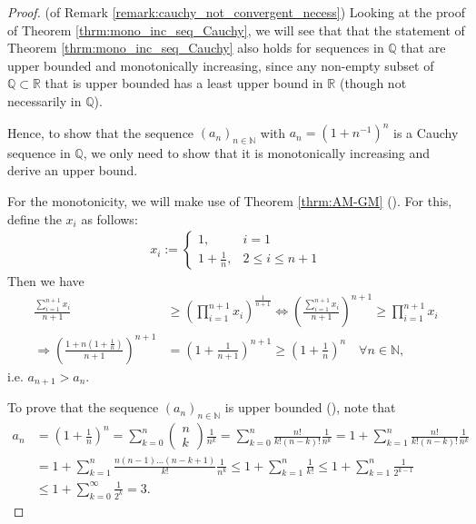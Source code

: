 \documentclass[12pt, a4paper]{article}
\numberwithin{equation}{section}
\theoremstyle{definition}
\theoremstyle{definition}
\begin{document}
	\begin{proof}(of Remark \ref{remark:cauchy_not_convergent_necess}) 
		Looking at the proof of Theorem \ref{thrm:mono_inc_seq_Cauchy}, we will see that that the statement of Theorem \ref{thrm:mono_inc_seq_Cauchy} also holds for sequences in $\mathbb Q$ that are upper bounded and monotonically increasing, since any non-empty subset of $\mathbb Q\subset \mathbb R$ that is upper bounded has a least upper bound in $\mathbb R$ (though not necessarily in $\mathbb Q$). 
		
		Hence, to show that the sequence $(a_n)_{n\in\mathbb N}$ with $a_n = \left(1 + n^{-1}\right)^n$ is a Cauchy sequence in $\mathbb Q$, we only need to show that it is monotonically increasing and derive an upper bound.
			
		For the monotonicity, we will make use of Theorem \ref{thrm:AM-GM} (\cite{64864}). For this, define the $x_i$ as follows: 
		\begin{align}
			x_i := \begin{cases}
				1, & i = 1
				\\ 1 + \frac{1}{n}, & 2 \leq i \leq n + 1
			\end{cases}
		\end{align}
		Then we have
		\begin{align}
			\frac{\sum_{i=1}^{n + 1}x_i}{n + 1} &\geq \left(\prod_{i = 1}^{n + 1}x_i\right)^{\frac{1}{n+1}} 
			\Leftrightarrow \left(\frac{\sum_{i=1}^{n + 1}x_i}{n + 1}\right)^{n+1} \geq \prod_{i = 1}^{n + 1}x_i
			\\ \Rightarrow \left(\frac{1 + n\left(1 + \frac{1}{n}\right)}{n+1}\right)^{n + 1} &= \left(1 + \frac{1}{n + 1}\right)^{n + 1} \geq \left(1 + \frac{1}{n}\right)^n \quad\forall n\in\mathbb N,
		\end{align}
		i.e. $a_{n+1} > a_n$.
		
		To prove that the sequence $(a_n)_{n\in\mathbb N}$ is upper bounded (\cite{5065619}), note that
		\begin{align}
			a_n &= \left(1 + \frac{1}{n}\right)^n = \sum_{k=0}^{n}\begin{pmatrix}
				n \\ k
			\end{pmatrix}\frac{1}{n^k} = \sum_{k = 0}^{n}\frac{n!}{k!(n-k)!}\frac{1}{n^k} = 1 + \sum_{k = 1}^{n}\frac{n!}{k!(n-k)!}\frac{1}{n^k}
			\\ &= 1 + \sum_{k = 1}^{n}\frac{n(n-1)\dots (n-k+1)}{k!}\frac{1}{n^k} \leq 1 + \sum_{k=1}^{n}\frac{1}{k!} \leq 1 + \sum_{k=1}^{n}\frac{1}{2^{k-1}}
			\\ &\leq 1 + \sum_{k=0}^{\infty}\frac{1}{2^k} = 3.
		\end{align}
	\end{proof}
\end{document}
